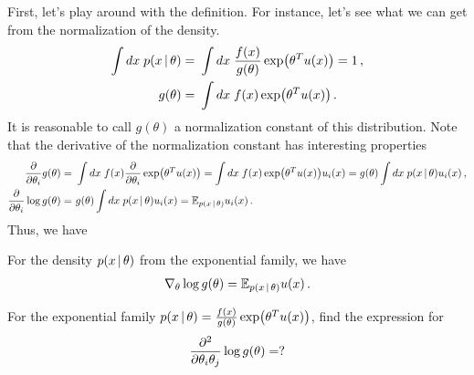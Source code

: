First, let's play around with the definition.
For instance, let's see what we can get from the normalization of the density.
\begin{align}
    \int dx\; p(x\cond \theta) =~& \int dx\; \frac{f(x)}{g(\theta)}\exp\left(\theta^Tu(x)\right) = 1\,,\\
    g(\theta) =~& \int dx\; f(x)\exp\left(\theta^Tu(x)\right)\,.
\end{align}
It is reasonable to call $g(\theta)$ a normalization constant of this distribution.
Note that the derivative of the normalization constant has interesting properties
\begin{align}
    \deriv{}{\theta_i}g(\theta) =~& \int dx\; f(x)\deriv{}{\theta_i}\exp\left(\theta^Tu(x)\right) = \int dx\; f(x)\exp\left(\theta^Tu(x)\right)u_i(x) = g(\theta)\int dx\; p(x\cond \theta) u_i(x)\,,\\
    \deriv{}{\theta_i}\log g(\theta) =~& g(\theta)\int dx\; p(x\cond \theta) u_i(x) = \mean_{p(x\cond \theta)}u_i(x)\,.
\end{align}
Thus, we have
\begin{proposition}
\label{prop:grad_norm_constant}
    For the density $p(x\,|\, \theta)$ from the exponential family, we have
    \begin{align}
        \nabla_\theta\log g(\theta) = \mathbb{E}_{p(x\,|\, \theta)}u(x)\,.
    \end{align}
\end{proposition}

\begin{exercise}
For the exponential family $p(x\cond \theta) = \frac{f(x)}{g(\theta)}\exp\left(\theta^Tu(x)\right)$, find the expression for
\begin{align}
    \frac{\partial ^2}{\partial \theta_i\theta_j}\log g(\theta) = ?
\end{align}
\end{exercise}

